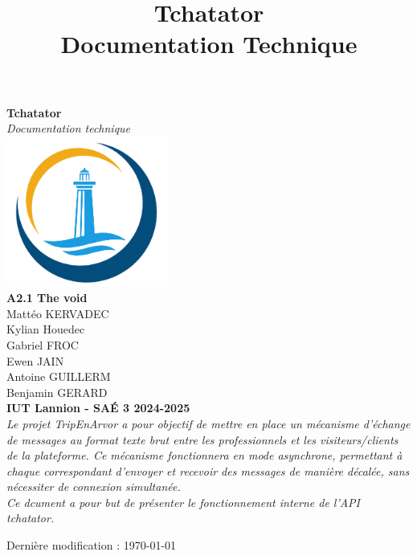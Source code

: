 \documentclass{report}
\title{\Huge Tchatator \\ {\LARGE Documentation Technique}}
\begin{document}
\begin{titlepage}
    \begin{center}
        {\Huge\bfseries Tchatator} \\[1cm]
        {\Large\textit{Documentation technique}} \\[2cm]

        \includegraphics[width=0.4\textwidth]{../../../html/img/logo.png} \\[2cm]

        {\Large \textbf{A2.1 The void}} \\ [.2cm]
        {\large Mattéo KERVADEC } \\[.2cm]
        {\large Kylian Houedec } \\[.2cm]
        {\large Gabriel FROC } \\[.2cm]
        {\large Ewen JAIN } \\[.2cm]
        {\large Antoine GUILLERM } \\[.2cm]
        {\large Benjamin GERARD } \\[1cm]

        \textbf{IUT Lannion - SAÉ 3 2024-2025} \\[1.2cm]

        \textit{
        Le projet TripEnArvor a pour objectif de mettre en place un mécanisme d’échange de messages au format texte brut entre les professionnels et les visiteurs/clients de la plateforme. Ce mécanisme fonctionnera en mode asynchrone, permettant à chaque correspondant d’envoyer et recevoir des messages de manière décalée, sans nécessiter de connexion simultanée. 
		} \\[0.5cm]
		
		\textit{
        Ce dcument a pour but de présenter le fonctionnement interne de l'API tchatator.
		}

        \vfill  %

        {\small Dernière modification : \today}
    \end{center}
\end{titlepage}
\end{document}
